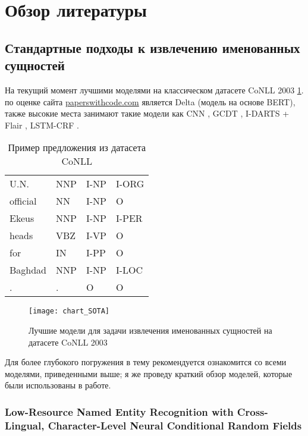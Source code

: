 \section{Обзор литературы}

\subsection{Стандартные подходы к извлечению именованных сущностей}

На текущий момент лучшими моделями на классическом датасете CoNLL 2003 \cite{tjong-kim-sang-de-meulder-2003-introduction} \ref{table:example_CoNLL}. по оценке сайта \href{https://paperswithcode.com/sota/named-entity-recognition-ner-on-conll-2003}{paperswithcode.com} является Delta \cite{delta} (модель на основе BERT), также высокие места занимают такие модели как CNN \cite{CNN_top_2_SOTA}, GCDT \cite{Liu:19}, I-DARTS + Flair \cite{jiang-etal-2019-improved}, LSTM-CRF \cite{strakova-etal-2019-neural}.

\begin{table}[h]
\caption{Пример предложения из датасета CoNLL}
\begin{tabular}{llll}
U.N. & NNP & I-NP & I-ORG \\
official & NN & I-NP & O \\
Ekeus & NNP & I-NP& I-PER \\
heads & VBZ & I-VP & O\\
for & IN & I-PP & O \\
Baghdad & NNP & I-NP & I-LOC \\
. & . & O & O
\end{tabular}
\label{table:example_CoNLL}
\end{table}

\begin{figure}[h]
\texttt{[image: chart\_SOTA]}
\label{fig:chart_SOTA}
\caption{Лучшие модели для задачи извлечения именованных сущностей на датасете CoNLL 2003}
\end{figure}

Для более глубокого погружения в тему рекомендуется ознакомится со всеми моделями, приведенными выше; я же проведу краткий обзор моделей, которые были использованы в работе.

\subsubsection{Low-Resource Named Entity Recognition with Cross-Lingual, Character-Level Neural Conditional Random Fields}

